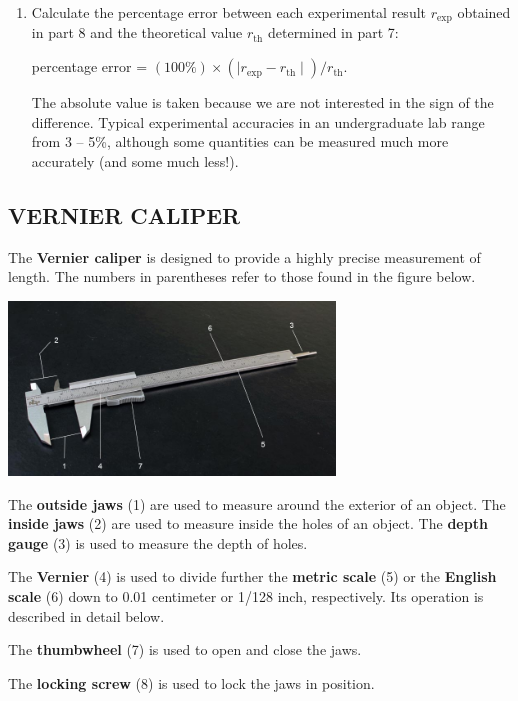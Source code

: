 \begin{enumerate}
\item Calculate the percentage error between each experimental result \(r_{\textrm{exp}}\) obtained in part 8 and the theoretical value \(r_{\textrm{th}}\) determined in part 7:

percentage error = \( (100\%) \times \left(\mid r_{\textrm{exp}} - r_{\textrm{th}} \mid\right) / r_{\textrm{th}} . \)

The absolute value is taken because we are not interested in the sign of the difference.  Typical experimental accuracies in an undergraduate lab range from 3 -- 5\%, although some quantities can be measured much more accurately (and some much less!).

\end{enumerate}

\subsection*{VERNIER CALIPER}

The \textbf{Vernier caliper} is designed to provide a highly precise measurement of length.  The numbers in parentheses refer to those found in the figure below.
\begin{center} \includegraphics*[width=0.65\textwidth]{imgs/6labs/6Alab/6Aexp2/6A-EXP2-fig7_webtext.jpg} \end{center}

The \textbf{outside jaws} (1) are used to measure around the exterior of an object.  The \textbf{inside jaws} (2) are used to measure inside the holes of an object.  The \textbf{depth gauge} (3) is used to measure the depth of holes.

The \textbf{Vernier} (4) is used to divide further the \textbf{metric scale} (5) or the \textbf{English scale} (6) down to 0.01 centimeter or 1/128 inch, respectively.  Its operation is described in detail below.

The \textbf{thumbwheel} (7) is used to open and close the jaws.

The \textbf{locking screw} (8) is used to lock the jaws in position.

